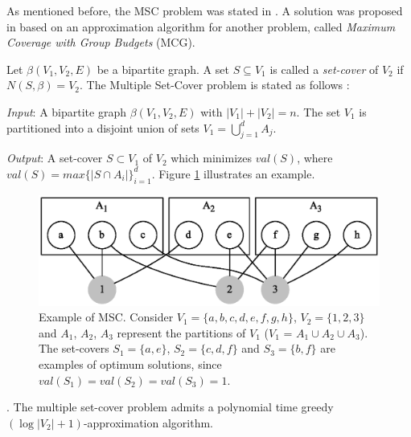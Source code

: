As mentioned before, the MSC problem was stated in \cite{Elkin2003,Elkin2006}. A solution was proposed in \cite{Chekuri2004} based on an approximation algorithm 
for another problem, called \emph{Maximum Coverage with Group Budgets} (MCG). 

Let $\beta(V_1,V_2,E)$ be a bipartite graph.  A set $S \subseteq V_1$ is called a \emph{set-cover} of $V_2$ if $N(S,\beta) = V_2$. 
The Multiple Set-Cover problem is stated as follows \cite{Elkin2006}:

\vspace{0.3cm}
\noindent \emph{Input}: A bipartite graph $\beta(V_1,V_2,E)$ with \mbox{$|V_1| + |V_2| = n$}. The set $V_1$ is partitioned into a disjoint union of sets 
\mbox{$V_1 = \bigcup_{j=1}^{d}A_j$}. 

\vspace{0.3cm}
\noindent \emph{Output}: A set-cover $S \subset V_1$ of $V_2$ which minimizes $val(S)$, where
\mbox{$val(S) = max\lbrace |S \cap A_i| \rbrace_{i=1}^{d}$}. Figure \ref{fig:msc} illustrates an example.

\begin{figure}[t]
\centering
\includegraphics[scale=0.75]{imagens/msc_label}
\caption[Example of MSC]{Example of MSC. Consider $V_1 = \lbrace a,b,c,d,e,f,g,h \rbrace$, $V_2 = \lbrace 1,2,3 \rbrace$ and $A_1$, $A_2$, $A_3$ represent the partitions of $V_1$ ($V_1$ = $A_1 \cup A_2 \cup A_3$). 
The set-covers $S_1 = \lbrace a,e \rbrace$, $S_2 = \lbrace c,d,f \rbrace$ and $S_3 = \lbrace b,f \rbrace$ are examples of optimum solutions, since 
$val(S_1) = val(S_2) = val(S_3) = 1$.}
\label{fig:msc}
\end{figure}

\begin{Theo}
  \label{teorema:fator_aproximacao}
  \cite{Chekuri2004}. The multiple set-cover problem admits a polynomial time greedy $(\log |V_2| + 1)$-approximation algorithm.
\end{Theo}

